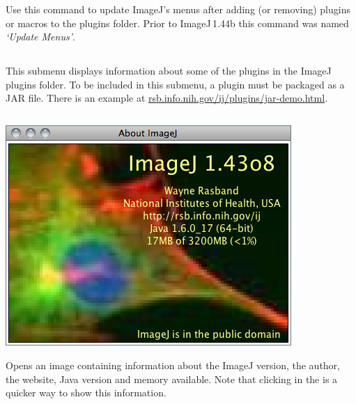 Use this command to update ImageJ's menus after adding
(or removing) plugins or macros to the plugins folder. Prior to ImageJ\,1.44b
this command was named \emph{`Update Menus'}.


\subsection{\protect{}\label{sub:About-Plugins}}

This submenu displays information about some of the plugins in the
ImageJ plugins folder. To be included in this submenu, a plugin must
be packaged as a JAR file. There is an example at \href{http://imagej.nih.gov/ij/plugins/jar-demo.html}{rsb.info.nih.gov/ij/plugins/jar-demo.html}. 


\subsection{\protect{}\label{sub:About-ImageJ...}}

\begin{minipage}[c][1\totalheight][t]{0.556\columnwidth}%
\includegraphics[scale=0.55]{images/AboutImageJ}%
\end{minipage}%
\begin{minipage}[c][1\totalheight][t]{0.444\columnwidth}%
Opens an image containing information about the ImageJ version, the
author, the website, Java version and memory available. Note that
clicking in the  is a quicker way to show
this information.


%
\end{minipage}
